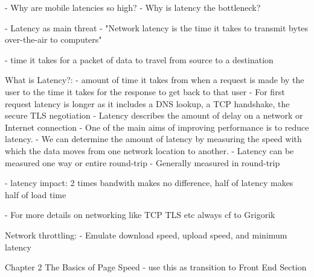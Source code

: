 - Why are mobile latencies so high?
- Why is latency the bottleneck?


- Latency as main threat
- "Network latency is the time it takes to transmit bytes over-the-air to computers"


- time it takes for a packet of data to travel from source to a destination

What is Latency?:
- amount of time it takes from when a request is made by the user to the time it takes for the response to get back to that user
- For first request latency is longer as it includes a DNS lookup, a TCP handshake, the secure TLS negotiation
- Latency describes the amount of delay on a network or Internet connection
- One of the main aims of improving performance is to reduce latency.
- We can determine the amount of latency by measuring the speed with which the data moves from one network location to another.
- Latency can be measured one way or entire round-trip
- Generally measured in round-trip



- latency impact: 2 times bandwith makes no difference, half of latency makes half of load time

- For more details on networking like TCP TLS etc always cf to Grigorik

Network throttling:
- Emulate download speed, upload speed, and minimum latency

Chapter 2 The Basics of Page Speed
- use this as transition to Front End Section






